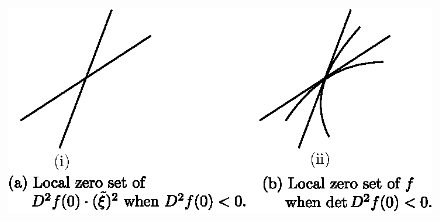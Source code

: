 \begin{figure}[H]
\centering
\includegraphics{figure/fig76-3.3.eps}
\caption{}
\end{figure}\pageoriginale

